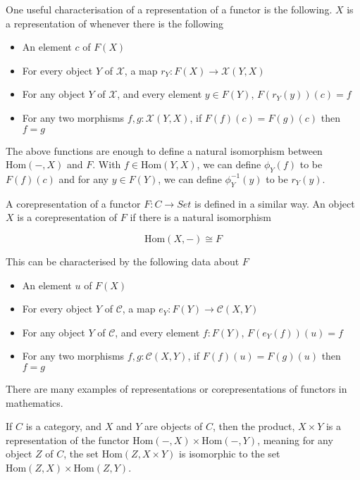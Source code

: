 \documentclass[12pt]{article} %
\theoremstyle{definition}
\theoremstyle{definition}
\theoremstyle{definition}
\theoremstyle{definition}
\begin{document}
One useful characterisation of a representation of a functor is the following. $X$ is a representation of
whenever there is the following

\begin{itemize}
  \item An element $c$ of $F(X)$
  \item For every object $Y$ of $\mathcal{X}$, a map $r_Y : F(X) \to \mathcal{X}(Y, X)$
  \item For any object $Y$ of $\mathcal{X}$, and every element $y \in F(Y)$, $F(r_Y(y))(c) = f$
  \item For any two morphisms $f, g : \mathcal{X}(Y, X)$, if $F(f)(c) = F(g)(c)$ then $f = g$
\end{itemize}

The above functions are enough to define a natural isomorphism between $\text{Hom}(-, X)$ and $F$.
With $f \in \text{Hom}(Y,X)$, we can define $\phi_Y(f)$ to be $F(f)(c)$ and
 for any $y \in F(Y)$, we can define $\phi_Y^{-1}(y)$ to be $r_Y(y)$.

A corepresentation of a functor $F : C \rightarrow Set$ is defined in a similar way.
An object $X$ is a corepresentation of $F$ if there is a natural isomorphism

\begin{equation}
  \text{Hom}(X, -) \cong F
\end{equation}

This can be characterised by the following data about $F$

\begin{itemize}
  \item An element $u$ of $F(X)$
  \item For every object $Y$ of $\mathcal{C}$, a map $e_Y : F(Y) \to \mathcal{C}(X, Y)$
  \item For any object $Y$ of $\mathcal{C}$, and every element $f : F(Y)$, $F(e_Y(f))(u) = f$
  \item For any two morphisms $f, g : \mathcal{C}(X, Y)$, if $F(f)(u) = F(g)(u)$ then $f = g$
\end{itemize}


There are many examples of representations or corepresentations of functors in mathematics.

If $C$ is a category, and $X$ and $Y$ are objects of $C$, then the product, $X \times Y$ is a representation
of the functor $\text{Hom}(-, X) \times \text{Hom}(-, Y)$, meaning for any object $Z$ of $C$, the set
$\text{Hom}(Z, X \times Y)$ is isomorphic to the set $\text{Hom}(Z, X) \times \text{Hom}(Z, Y)$.
\end{document}
